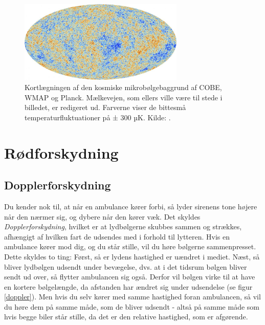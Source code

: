 \begin{figure}[]
	\centering
	\includegraphics[width=0.7\textwidth]{Kosmo/2017/img/cmb_planck.jpg}
	\caption{Kortlægningen af den kosmiske mikrobølgebaggrund af COBE, WMAP og
		Planck. Mælkevejen, som ellers ville være til stede i billedet, er redigeret ud. Farverne viser de bittesmå temperaturfluktuationer på ± 300 µK. Kilde: \cite{CosmicMicrowaveBackgrounda}.}%
	\label{CMB}
\end{figure}

\section{Rødforskydning}
\label{12}
\subsection{Dopplerforskydning}
Du kender nok til, at når en ambulance kører forbi, så lyder sirenens tone højere når den nærmer sig, og dybere når den kører væk. Det skyldes \emph{Dopplerforskydning}, %
hvilket er at lydbølgerne skubbes sammen og strækkes, afhængigt af hvilken fart de udsendes med i forhold til lytteren. Hvis en ambulance kører mod dig, og du står stille, vil du høre bølgerne sammenpresset. Dette skyldes to ting: Først, så er lydens hastighed er uændret i mediet. Næst, så bliver lydbølgen udsendt under bevægelse, dvs. at i det tidsrum bølgen bliver sendt ud over, så flytter ambulancen sig også. Derfor vil bølgen virke til at have en kortere bølgelængde, da afstanden har ændret sig under udsendelse (se figur \ref{doppler}). %
Men hvis du selv kører med samme hastighed foran ambulancen, så vil du høre dem på samme måde, som de bliver udsendt - altså på samme måde som hvis begge biler står stille, da det er den relative hastighed, som er afgørende.

